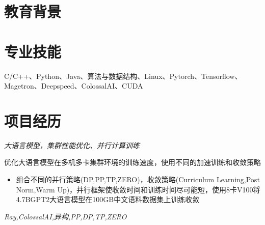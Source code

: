 \documentclass{uniquecv}
\begin{document}

\medskip



\section{教育背景}



\section{专业技能}
\smallskip
C/C++、Python、Java、算法与数据结构、Linux、Pytorch、Tensorflow、Magetron、Deepspeed、ColossalAI、CUDA





\section{项目经历}

\textit{大语言模型，集群性能优化、并行计算训练}
\vspace{0.4ex}

优化大语言模型在多机多卡集群环境的训练速度，使用不同的加速训练和收敛策略
\begin{itemize}
  \item 组合不同的并行策略(DP,PP,TP,ZERO)，收敛策略(Curriculum Learning,Post Norm,Warm Up)，并行框架使收敛时间和训练时间尽可能短，使用8卡V100将4.7BGPT2大语言模型在100GB中文语料数据集上训练收敛
\end{itemize}
\textit{Ray,ColossalAI,异构,PP,DP,TP,ZERO}
\vspace{0.4ex}
\end{document}
